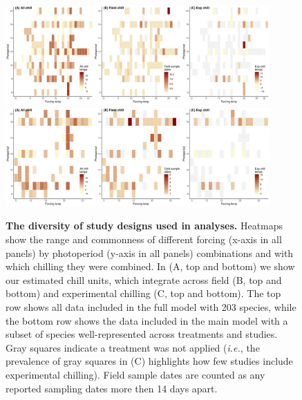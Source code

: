 \documentclass{article}
\begin{document}
\newpage
\begin{figure}[h!]
\centering
\noindent \includegraphics[width=0.9\textwidth]{..//..//analyses/bb_analysis/figures/studydesign/studydesign_heat3panelallsppmodel.pdf}
\noindent \includegraphics[width=0.9\textwidth]{..//..//analyses/bb_analysis/figures/studydesign/studydesign_heat3panelmainmodel.pdf}
\caption{\textbf{The diversity of study designs used in analyses.} Heatmaps show the range and commonness of different forcing (x-axis in all panels) by photoperiod (y-axis in all panels) combinations and with which chilling they were combined. In (A, top and bottom) we show our estimated chill units, which integrate across field (B, top and bottom) and experimental chilling (C, top and bottom). The top row shows all data included in the full model with 203 species, while the bottom row shows the data included in the main model with a subset of species well-represented across treatments and studies. Gray squares indicate a treatment was not applied (\emph{i.e.}, the prevalence of gray squares in (C) highlights how few studies include experimental chilling). Field sample dates are counted as any reported sampling dates more then 14 days apart.}
\label{fig:treatheatmaps} %
\end{figure}
\end{document}
